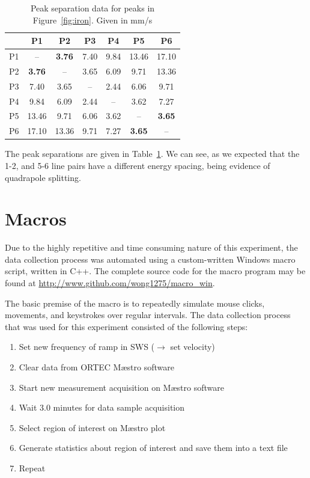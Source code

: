 \documentclass[paper=a4, fontsize=11pt, abstract=on]{scrartcl} %
\numberwithin{equation}{section}
\numberwithin{figure}{section}
\numberwithin{table}{section}
\begin{document}
\begin{table}[h]
  \centering
  \begin{tabular}{r|cccccc}
       & P1 & P2 & P3 & P4 & P5 & P6 \\ \hline
    P1 & --   & \textbf{3.76}  & 7.40  & 9.84 & 13.46  & 17.10    \\
    P2 & \textbf{3.76}   & --  &  3.65   & 6.09  & 9.71 & 13.36   \\
    P3 & 7.40   & 3.65   & --  & 2.44  & 6.06   & 9.71   \\
    P4 & 9.84   & 6.09   & 2.44   & -- & 3.62   & 7.27  \\
    P5 & 13.46   & 9.71   & 6.06   & 3.62   & -- & \textbf{3.65} \\ 
    P6 & 17.10   & 13.36   & 9.71   & 7.27   & \textbf{3.65} & --  \\
  \end{tabular}
  \caption{Peak separation data for peaks in
    Figure~\ref{fig:iron}. Given in mm/s}
  \label{tab:sep}
\end{table}

The peak separations are given in
Table~\ref{tab:sep}. We can see, as we expected that the 1-2, and
5-6 line pairs have a different energy spacing, being evidence of
quadrapole splitting. 

\appendix

\section{Macros}
\label{sec:macros}

Due to the highly repetitive and time consuming nature of this experiment, the data collection process was automated using a custom-written Windows macro script, written in C++. The complete source code for the macro program may be found at \url{http://www.github.com/wong1275/macro_win}.

The basic premise of the macro is to repeatedly simulate mouse clicks, movements, and keystrokes over regular intervals. The data collection process that was used for this experiment consisted of the following steps:

\begin{enumerate}
\item Set new frequency of ramp in SWS ($\rightarrow$ set velocity)
\item Clear data from ORTEC M\ae{}stro software
\item Start new measurement acquisition on M\ae{}stro software
\item Wait $3.0$ minutes for data sample acquisition
\item Select region of interest on M\ae{}stro plot
\item Generate statistics about region of interest and save them into a text file
\item Repeat
\end{enumerate}
\end{document}
